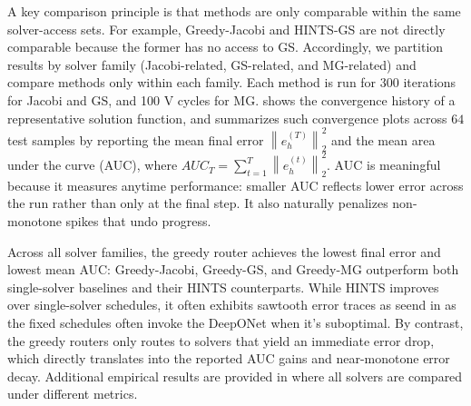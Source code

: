 \documentclass{article} %
\begin{document}
A key comparison principle is that methods are only comparable within the same solver-access sets. For example, Greedy-Jacobi and HINTS-GS are not directly comparable because the former has no access to GS. Accordingly, we partition results by solver family (Jacobi-related, GS-related, and MG-related) and compare methods only within each family. Each method is run for 300 iterations for Jacobi and GS, and 100 V cycles for MG.  shows the convergence history of a representative solution function, and  summarizes such convergence plots across $64$ test samples by reporting the mean final error $\left\|e^{(T)}_h\right\|^2_2$ and the mean area under the curve (AUC), where $AUC_T = \sum_{t = 1}^T\left\|e^{(t)}_h\right\|^2_2$. AUC is meaningful because it measures anytime performance: smaller AUC reflects lower error across the run rather than only at the final step. It also naturally penalizes non-monotone spikes that undo progress. 

Across all solver families, the greedy router achieves the lowest final error and lowest mean AUC: Greedy-Jacobi, Greedy-GS, and Greedy-MG outperform both single-solver baselines and their HINTS counterparts. While HINTS improves over single-solver schedules, it often exhibits sawtooth error traces as seend in  as the fixed schedules often invoke the DeepONet when it's suboptimal. By contrast, the greedy routers only routes to solvers that yield an immediate error drop, which directly translates into the reported AUC gains and near-monotone error decay. Additional empirical results are provided in  where all solvers are compared under different metrics.
\end{document}
